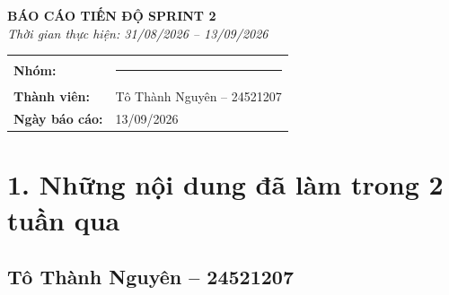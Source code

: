 \documentclass[12pt,a4paper]{article}
\begin{document}
\begin{center}
    {\Large\textbf{BÁO CÁO TIẾN ĐỘ SPRINT 2}}\\[0.5em]
    \textit{Thời gian thực hiện: 31/08/2026 -- 13/09/2026}
\end{center}

\vspace{1em}

\begin{tabular}{@{}>{\bfseries}p{4cm}p{10cm}@{}}
Nhóm:           & \rule{3cm}{0.4pt} \\[0.6em]
Thành viên:     & Tô Thành Nguyên -- 24521207 \\[0.6em]
Ngày báo cáo:   & 13/09/2026
\end{tabular}

\vspace{1.5em}

\section*{1. Những nội dung đã làm trong 2 tuần qua}

\subsection*{Tô Thành Nguyên -- 24521207}
\end{document}
